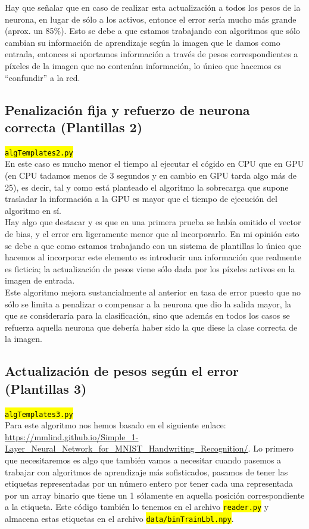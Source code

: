 \documentclass[10pt,a4paper]{article}
\newcommand{\archive}[1]{\sethlcolor{light-green}\hl{\texttt{#1}}} %
\begin{document}
Hay que señalar que en caso de realizar esta actualización a todos los pesos de la neurona, en lugar de sólo a los activos, entonce el error sería mucho más grande (aprox. un 85\%). Esto se debe a que estamos trabajando con algoritmos que sólo cambian su información de aprendizaje según la imagen que le damos como entrada, entonces si aportamos información a través de pesos correspondientes a píxeles de la imagen que no contenían información, lo único que hacemos es ``confundir'' a la red.

\subsection{Penalización fija y refuerzo de neurona correcta (Plantillas 2)}
\archive{algTemplates2.py}\\

En este caso es mucho menor el tiempo al ejecutar el cógido en CPU que en GPU (en CPU tadamos menos de 3 segundos y en cambio en GPU tarda algo más de 25), es decir, tal y como está planteado el algoritmo la sobrecarga que supone trasladar la información a la GPU es mayor que el tiempo de ejecución del algoritmo en sí.\\

Hay algo que destacar y es que en una primera prueba se había omitido el vector de bias, y el error era ligeramente menor que al incorporarlo. En mi opinión esto se debe a que como estamos trabajando con un sistema de plantillas lo único que hacemos al incorporar este elemento es introducir una información que realmente es ficticia; la actualización de pesos viene sólo dada por los píxeles activos en la imagen de entrada.\\

Este algoritmo mejora sustancialmente al anterior en tasa de error puesto que no sólo se limita a penalizar o compensar a la neurona que dio la salida mayor, la que se consideraría para la clasificación, sino que además en todos los casos se refuerza aquella neurona que debería haber sido la que diese la clase correcta de la imagen.

\subsection{Actualización de pesos según el error (Plantillas 3)}
\archive{algTemplates3.py}\\

Para este algoritmo nos hemos basado en el siguiente enlace: \url{https://mmlind.github.io/Simple_1-Layer_Neural_Network_for_MNIST_Handwriting_Recognition/}. Lo primero que necesitaremos es algo que también vamos a necesitar cuando pasemos a trabajar con algoritmos de aprendizaje más sofisticados, pasamos de tener las etiquetas representadas por un número entero por tener cada una representada por un array binario que tiene un 1 sólamente en aquella posición correspondiente a la etiqueta. Este código también lo tenemos en el archivo \archive{reader.py} y almacena estas etiquetas en el archivo \archive{data/binTrainLbl.npy}.\\
\end{document}
